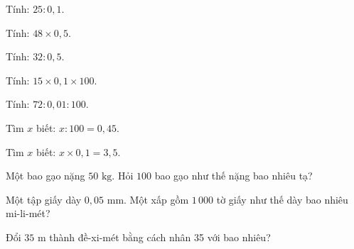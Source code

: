 \begin{ex}
  Tính: $25 : 0{,}1$.
\end{ex}

\begin{ex}
  Tính: $48 \times 0{,}5$.
\end{ex}

\begin{ex}
  Tính: $32 : 0{,}5$.
\end{ex}

\begin{ex}
  Tính: $15 \times 0{,}1 \times 100$.
\end{ex}

\begin{ex}
  Tính: $72 : 0{,}01 : 100$.
\end{ex}

\begin{ex}
  Tìm $x$ biết: $x : 100 = 0{,}45$.
\end{ex}

\begin{ex}
  Tìm $x$ biết: $x \times 0{,}1 = 3{,}5$.
\end{ex}

\begin{ex}
  Một bao gạo nặng $50\text{ kg}$. Hỏi $100$ bao gạo như thế nặng bao nhiêu tạ?
\end{ex}

\begin{ex}
  Một tập giấy dày $0{,}05\text{ mm}$. Một xấp gồm $1\,000$ tờ giấy như thế dày bao nhiêu mi-li-mét?
\end{ex}

\begin{ex}
  Đổi $35\text{ m}$ thành đề-xi-mét bằng cách nhân 35 với bao nhiêu?
\end{ex}

